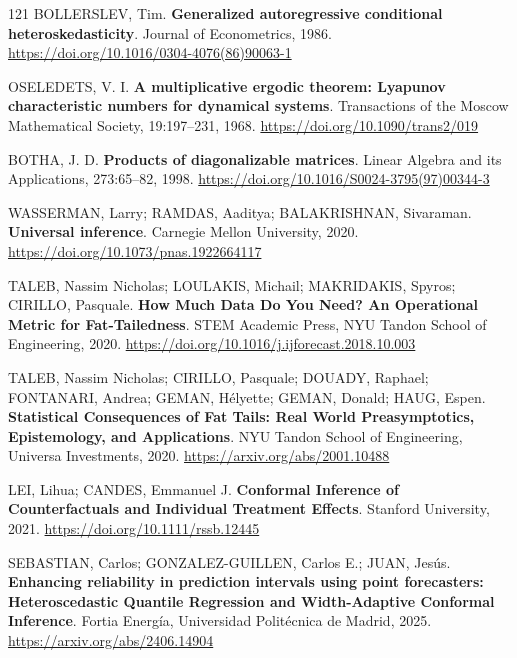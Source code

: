 \begin{thebibliography}{121}
  BOLLERSLEV, Tim.
  \newblock \textbf{Generalized autoregressive conditional heteroskedasticity}.
  \newblock Journal of Econometrics, 1986.
  \newblock \url{https://doi.org/10.1016/0304-4076(86)90063-1}

  OSELEDETS, V. I.
  \newblock \textbf{A multiplicative ergodic theorem: Lyapunov characteristic numbers for dynamical systems}.
  \newblock Transactions of the Moscow Mathematical Society, 19:197--231, 1968.
  \newblock \url{https://doi.org/10.1090/trans2/019}

  BOTHA, J. D.
  \newblock \textbf{Products of diagonalizable matrices}.
  \newblock Linear Algebra and its Applications, 273:65--82, 1998.
  \newblock \url{https://doi.org/10.1016/S0024-3795(97)00344-3}

  WASSERMAN, Larry; RAMDAS, Aaditya; BALAKRISHNAN, Sivaraman.
  \newblock \textbf{Universal inference}.
  \newblock Carnegie Mellon University, 2020.
  \newblock \url{https://doi.org/10.1073/pnas.1922664117}

  TALEB, Nassim Nicholas; LOULAKIS, Michail; MAKRIDAKIS, Spyros; CIRILLO, Pasquale.
  \newblock \textbf{How Much Data Do You Need? An Operational Metric for Fat-Tailedness}.
  \newblock STEM Academic Press, NYU Tandon School of Engineering, 2020.
  \newblock \url{https://doi.org/10.1016/j.ijforecast.2018.10.003}

  TALEB, Nassim Nicholas; CIRILLO, Pasquale; DOUADY, Raphael; FONTANARI, Andrea; GEMAN, Hélyette; GEMAN, Donald; HAUG, Espen.
  \newblock \textbf{Statistical Consequences of Fat Tails: Real World Preasymptotics, Epistemology, and Applications}.
  \newblock NYU Tandon School of Engineering, Universa Investments, 2020.
  \newblock \url{https://arxiv.org/abs/2001.10488}

  LEI, Lihua; CANDES, Emmanuel J.
  \newblock \textbf{Conformal Inference of Counterfactuals and Individual Treatment Effects}.
  \newblock Stanford University, 2021.
  \newblock \url{https://doi.org/10.1111/rssb.12445}

  SEBASTIAN, Carlos; GONZALEZ-GUILLEN, Carlos E.; JUAN, Jesús.
  \newblock \textbf{Enhancing reliability in prediction intervals using point forecasters: Heteroscedastic Quantile Regression and Width-Adaptive Conformal Inference}.
  \newblock Fortia Energía, Universidad Politécnica de Madrid, 2025.
  \newblock \url{https://arxiv.org/abs/2406.14904}


\end{thebibliography}
